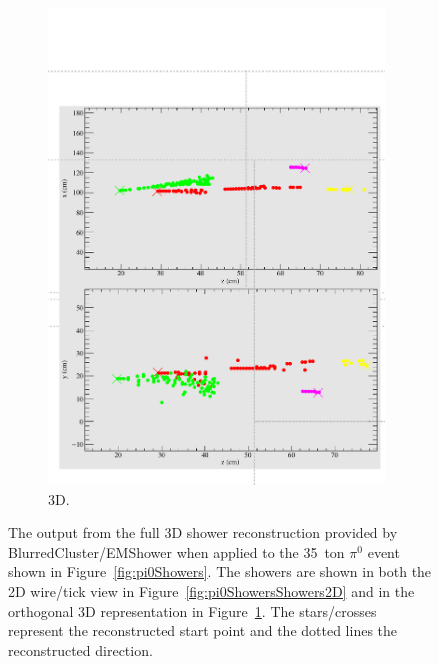 \begin{figure}
\begin{subfigure}[t]{0.48\linewidth}
    \includegraphics[width=0.98\textwidth]{EVDPi0Shower3D.pdf}
    \caption{3D.}
    \label{fig:pi0ShowersShowers3D}
  \end{subfigure}
  \caption[The output from the full 3D shower reconstruction provided by BlurredCluster/EMShower when applied to the 35~ton $\pi^0$ event shown in Figure~\ref{fig:pi0Showers}.]{The output from the full 3D shower reconstruction provided by BlurredCluster/EMShower when applied to the 35~ton $\pi^0$ event shown in Figure~\ref{fig:pi0Showers}.  The showers are shown in both the 2D wire/tick view in Figure~\ref{fig:pi0ShowersShowers2D} and in the orthogonal 3D representation in Figure~\ref{fig:pi0ShowersShowers3D}.  The stars/crosses represent the reconstructed start point and the dotted lines the reconstructed direction.}
  \label{fig:pi0ShowersShowers}
\end{figure}

